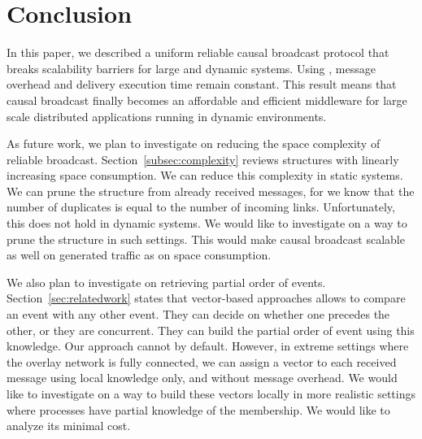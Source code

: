 
\section{Conclusion}
\label{sec:conclusion}

In this paper, we described a uniform reliable causal broadcast protocol that
breaks scalability barriers for large and dynamic systems. Using \CBROADCAST,
message overhead and delivery execution time remain constant.
This result means that causal broadcast finally becomes an affordable and
efficient middleware for large scale distributed applications running in dynamic
environments.

As future work, we plan to investigate on reducing the space complexity of
reliable broadcast. Section~\ref{subsec:complexity} reviews structures with
linearly increasing space consumption. We can reduce this complexity in static
systems. We can prune the structure from already received messages, for we know
that the number of duplicates is equal to the number of incoming
links. Unfortunately, this does not hold in dynamic systems. We would like to
investigate on a way to prune the structure in such settings. This would make
causal broadcast scalable as well on generated traffic as on space consumption.

We also plan to investigate on retrieving partial order of
events. Section~\ref{sec:relatedwork} states that vector-based approaches allows
to compare an event with any other event. They can decide on whether one
precedes the other, or they are concurrent. They can build the partial order of
event using this knowledge. Our approach cannot by default. However, in extreme
settings where the overlay network is fully connected, we can assign a vector to
each received message using local knowledge only, and without message
overhead. We would like to investigate on a way to build these vectors locally
in more realistic settings where processes have partial knowledge of the
membership. We would like to analyze its minimal cost.


